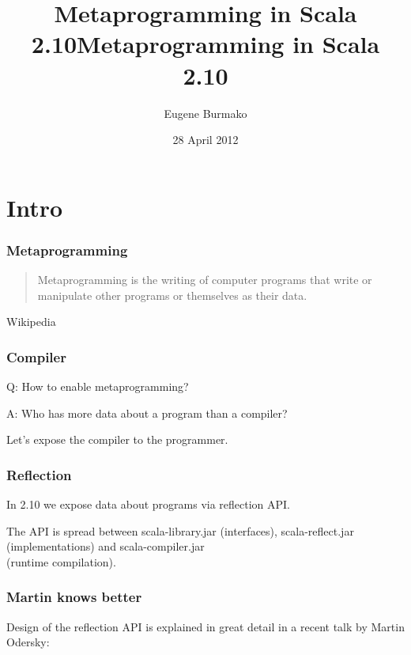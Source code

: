 \documentclass[hyperref={bookmarks=false}]{beamer}
\title{Metaprogramming in Scala 2.10}
\begin{document}
\title{Metaprogramming in Scala 2.10}
\author{Eugene Burmako}
\date{28 April 2012}
\maketitle

\section{Intro}

\begin{frame}[fragile]
\frametitle{Metaprogramming}

\begin{quote}
Metaprogramming is the writing of computer programs that write or manipulate other programs or themselves as their data.
\end{quote}

\begin{flushright}
\textemdash Wikipedia
\end{flushright}

\end{frame}

\begin{frame}[fragile]
\frametitle{Compiler}

Q: How to enable metaprogramming?

A: Who has more data about a program than a compiler?

Let's expose the compiler to the programmer.

\end{frame}

\begin{frame}[fragile]
\frametitle{Reflection}

In 2.10 we expose data about programs via reflection API.

The API is spread between scala-library.jar (interfaces), scala-reflect.jar (implementations) and scala-compiler.jar \\ (runtime compilation).

\end{frame}

\begin{frame}[fragile]
\frametitle{Martin knows better}

Design of the reflection API is explained in great detail in a recent talk by Martin Odersky:


\end{frame}
\end{document}

